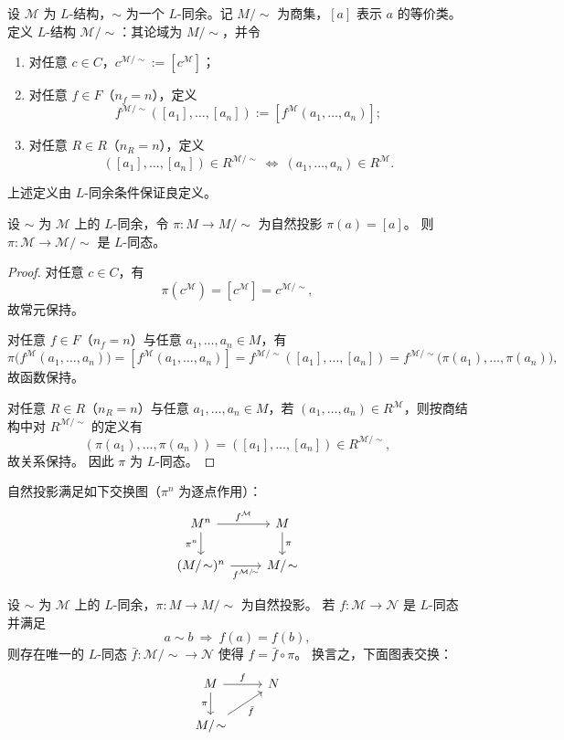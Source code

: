\documentclass[lang=cn,a4paper,newtx,section]{elegantbook}
\begin{document}
\begin{definition}[商结构]
设 $\mathcal M$ 为 $L$-结构，$\sim$ 为一个 $L$-同余。记 $M/\!\sim$ 为商集，$[a]$ 表示 $a$ 的等价类。
定义 $L$-结构 $\mathcal M/\!\sim$：其论域为 $M/\!\sim$，并令
\begin{enumerate}
  \item 对任意 $c\in C$，$c^{\mathcal M/\!\sim}:=[c^{\mathcal M}]$；
  \item 对任意 $f\in F$（$n_f=n$），定义
  \[
    f^{\mathcal M/\!\sim}([a_1],\dots,[a_n]):=[f^{\mathcal M}(a_1,\dots,a_n)];
  \]
  \item 对任意 $R\in R$（$n_R=n$），定义
  \[
    ([a_1],\dots,[a_n])\in R^{\mathcal M/\!\sim}\ \Longleftrightarrow\ (a_1,\dots,a_n)\in R^{\mathcal M}.
  \]
\end{enumerate}
上述定义由 $L$-同余条件保证良定义。
\end{definition}

\begin{proposition}
设 $\sim$ 为 $\mathcal M$ 上的 $L$-同余，令 $\pi:M\to M/\!\sim$ 为自然投影 $\pi(a)=[a]$。
则 $\pi:\mathcal M\to\mathcal M/\!\sim$ 是 $L$-同态。
\end{proposition}

\begin{proof}
对任意 $c\in C$，有
\[
  \pi(c^{\mathcal M})=[c^{\mathcal M}]=c^{\mathcal M/\!\sim},
\]
故常元保持。

对任意 $f\in F$（$n_f=n$）与任意 $a_1,\dots,a_n\in M$，有
\[
  \pi\bigl(f^{\mathcal M}(a_1,\dots,a_n)\bigr)=[f^{\mathcal M}(a_1,\dots,a_n)]=f^{\mathcal M/\!\sim}([a_1],\dots,[a_n])=f^{\mathcal M/\!\sim}\bigl(\pi(a_1),\dots,\pi(a_n)\bigr),
\]
故函数保持。

对任意 $R\in R$（$n_R=n$）与任意 $a_1,\dots,a_n\in M$，若 $(a_1,\dots,a_n)\in R^{\mathcal M}$，则按商结构中对 $R^{\mathcal M/\!\sim}$ 的定义有
\[
  (\pi(a_1),\dots,\pi(a_n))=([a_1],\dots,[a_n])\in R^{\mathcal M/\!\sim},
\]
故关系保持。
因此 $\pi$ 为 $L$-同态。
\end{proof}

\begin{remark}
自然投影满足如下交换图（$\pi^{n}$ 为逐点作用）：
\[
\begin{tikzcd}
M^{n} \arrow[r, "f^{\mathcal M}"] \arrow[d, "\pi^{n}"'] & M \arrow[d, "\pi"] \\
(M/\!\sim)^{n} \arrow[r, "f^{\mathcal M/\!\sim}"'] & M/\!\sim
\end{tikzcd}
\]
\end{remark}

\begin{proposition}[商结构的泛性质]
设 $\sim$ 为 $\mathcal M$ 上的 $L$-同余，$\pi:M\to M/\!\sim$ 为自然投影。
若 $f:\mathcal M\to\mathcal N$ 是 $L$-同态并满足
\[
  a\sim b\ \Longrightarrow\ f(a)=f(b),
\]
则存在唯一的 $L$-同态 $\bar f:\mathcal M/\!\sim\to\mathcal N$ 使得 $f=\bar f\circ\pi$。
换言之，下面图表交换：
\[
\begin{tikzcd}
M \arrow[r, "f"] \arrow[d, "\pi"'] & N \\
M/\!\sim \arrow[ur, "\bar f"'] &
\end{tikzcd}
\]
\end{proposition}
\end{document}
